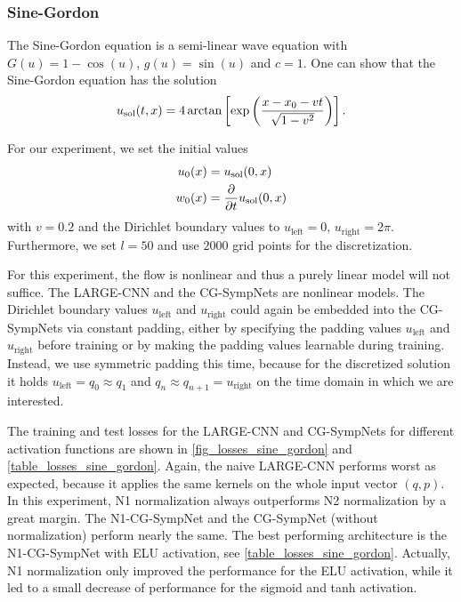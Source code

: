 \documentclass[twoside,a4paper]{article}
\begin{document}
\subsubsection{Sine-Gordon}

The Sine-Gordon equation is a 
semi-linear wave equation with $G(u) = 1 - \cos(u)$, $g(u) = \sin(u)$ and $c=1$.
One can show that the Sine-Gordon equation has the solution
\begin{equation*}
	u_{\text{sol}}(t,x) = 4 \arctan \left[ \exp \left( \frac{x-x_0-vt}{\sqrt{1-v^2}} \right) \right] 
	.
\end{equation*}

For our experiment, we set the initial values
\begin{align*}
	u_0(x) &= u_{\text{sol}}(0,x) \\
	w_0(x) &= \frac{\partial }{\partial t} u_{\text{sol}}(0,x)
\end{align*}
with $v=0.2$ and the Dirichlet boundary values to $u_{\text{left}} = 0, \, u_{\text{right}} = 2\pi$.
Furthermore, we set $l=50$ and use $2000$ grid points for the discretization.

For this experiment, the flow is nonlinear and thus a purely linear model will not suffice.
The LARGE-CNN and the CG-SympNets are nonlinear models.
The Dirichlet boundary values $u_{\text{left}}$ and $u_{\text{right}}$ could again
be embedded into the CG-SympNets via constant padding, 
either by specifying the padding values $u_{\text{left}}$ and $u_{\text{right}}$ before training
or by making the padding values learnable during training.
Instead, we use symmetric padding this time, because for the discretized solution it holds
$u_{\text{left}} = q_0 \approx q_1$ and $q_{n} \approx q_{n+1} = u_{\text{right}}$
on the time domain in which we are interested.

The training and test losses for the LARGE-CNN and CG-SympNets for different activation functions
are shown in \cref{fig_losses_sine_gordon} and \cref{table_losses_sine_gordon}.
Again, the naive LARGE-CNN performs worst as expected, 
because it applies the same kernels on the whole input vector $(q,p)$. 
In this experiment, N1 normalization always outperforms N2 normalization by a great margin.
The N1-CG-SympNet and the CG-SympNet (without normalization) perform nearly the same.
The best performing architecture is the N1-CG-SympNet
with ELU activation, see \cref{table_losses_sine_gordon}. Actually, N1 normalization
only improved the performance for the ELU activation, while it led to a small 
decrease of performance for the sigmoid and tanh activation.
\end{document}
